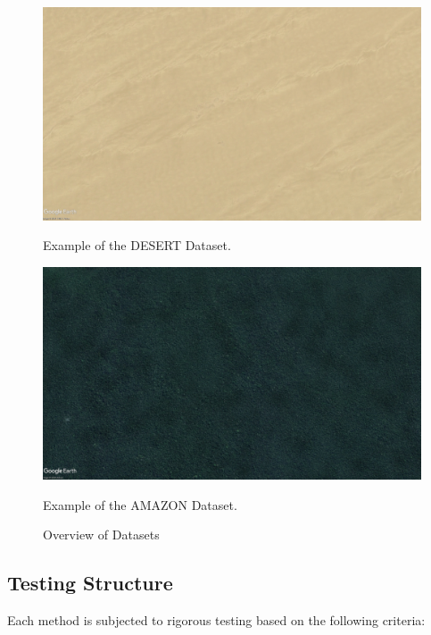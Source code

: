 \begin{figure}[H]
    \begin{minipage}{0.45\textwidth}
        \centering
        \includegraphics[width=\textwidth]{./Chapter 4/DEMODATASETS/DESERT1.jpg}
        \caption{Example of the DESERT Dataset.}
        \label{fig:DESERT}
    \end{minipage}\hfill
    \begin{minipage}{0.45\textwidth}
        \centering
        \includegraphics[width=\textwidth]{./Chapter 4/DEMODATASETS/AMAZON.jpg}
        \caption{Example of the AMAZON Dataset.}
        \label{fig:AMAZON}
    \end{minipage}
    
    \caption{Overview of Datasets}
    \label{fig:Datasets}
\end{figure}



\subsection{Testing Structure}

Each method is subjected to rigorous testing based on the following criteria:

